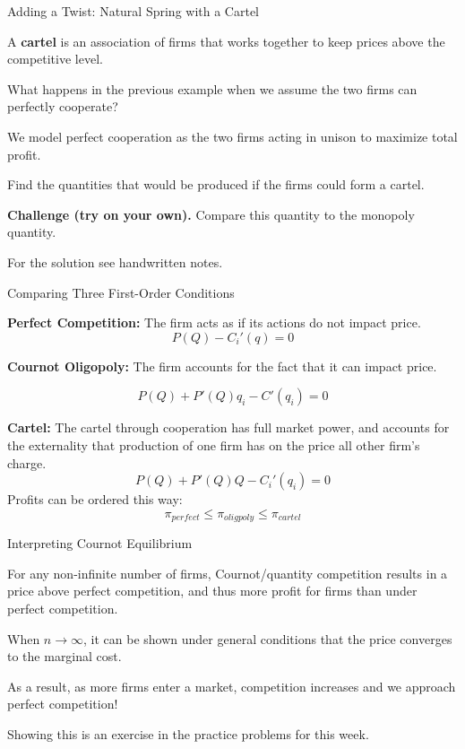 \documentclass[aspectratio=169]{beamer}
\newenvironment{wideitemize}{\itemize\addtolength{\itemsep}{10pt}}{\enditemize}
\begin{document}
\begin{frame}{Adding a Twist: Natural Spring with a Cartel}
\begin{definition}
A \textbf{cartel} is an association of firms that works together to keep prices above the competitive level.
\end{definition}
\begin{wideitemize}
    \item What happens in the previous example when we assume the two firms can perfectly cooperate?
    \item We model perfect cooperation as the two firms acting in unison to maximize total profit.
    \item Find the quantities that would be produced if the firms could form a cartel.
    \item \textbf{Challenge (try on your own).} Compare this quantity to the monopoly quantity.
    \item For the solution see handwritten notes.
\end{wideitemize}

\end{frame}



\begin{frame}{Comparing Three First-Order Conditions}

\textbf{Perfect Competition:} The firm acts as if its actions do not impact price.
\[P(Q)-C_i'(q)=0\]

\textbf{Cournot Oligopoly:} The firm accounts for the fact that it can impact price.

\[P(Q)+P'(Q)q_i -C'(q_i)=0\]

\textbf{Cartel:} The cartel through cooperation has full market power, and accounts for the externality that production of one firm has on the price all other firm's charge.
\[P(Q)+P'(Q)Q-C_i'(q_i)=0\]
Profits can be ordered this way:
\[\pi_{perfect}\leq \pi_{oligpoly}\leq \pi_{cartel}\]

\end{frame}

\begin{frame}{Interpreting Cournot Equilibrium}

\begin{wideitemize}
    \item For any non-infinite number of firms, Cournot/quantity competition results in a price above perfect competition, and thus more profit for firms than under perfect competition.
    \item When $n\to \infty$, it can be shown under general conditions that the price converges to the marginal cost.
    \item As a result, as more firms enter a market, competition increases and we approach perfect competition!
    \item Showing this is an exercise in the practice problems for this week.
\end{wideitemize}
    
\end{frame}
\end{document}
